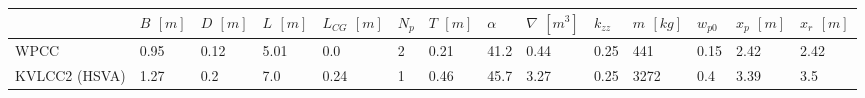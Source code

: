 \documentclass[review]{elsarticle}
\begin{document}
 \begin{savenotes}\sphinxattablestart
 \centering
 \sphinxthecaptionisattop
 \label{\detokenize{05.01_case_studies:main-dimensions-of-test-case-ship-models}}
 \sphinxaftertopcaption
 \begin{tabulary}{\linewidth}[t]{|T|T|T|T|T|T|T|T|T|T|T|T|T|T|}
 \hline
 \sphinxstyletheadfamily &\sphinxstyletheadfamily 
 
 \(B\) \([m]\)
 &\sphinxstyletheadfamily 
 
 \(D\) \([m]\)
 &\sphinxstyletheadfamily 
 
 \(L\) \([m]\)
 &\sphinxstyletheadfamily 
 
 \(L_{CG}\) \([m]\)
 &\sphinxstyletheadfamily 
 
 \(N_p\)
 &\sphinxstyletheadfamily 
 
 \(T\) \([m]\)
 &\sphinxstyletheadfamily 
 
 \(\alpha\)
 &\sphinxstyletheadfamily 
 
 \(\nabla\) \([m^3]\)
 &\sphinxstyletheadfamily 
 
 \(k_{zz}\)
 &\sphinxstyletheadfamily 
 
 \(m\) \([kg]\)
 &\sphinxstyletheadfamily 
 
 \(w_{p0}\)
 &\sphinxstyletheadfamily 
 
 \(x_{p}\) \([m]\)
 &\sphinxstyletheadfamily 
 
 \(x_{r}\) \([m]\)
 \\
 \hline
 
 WPCC
 &
 
 0.95
 &
 
 0.12
 &
 
 5.01
 &
 
 0.0
 &
 
 2
 &
 
 0.21
 &
 
 41.2
 &
 
 0.44
 &
 
 0.25
 &
 
 441
 &
 
 0.15
 &
 
 \sphinxhyphen{}2.42
 &
 
 \sphinxhyphen{}2.42
 \\
 \hline
 
 KVLCC2 (HSVA)
 &
 
 1.27
 &
 
 0.2
 &
 
 7.0
 &
 
 0.24
 &
 
 1
 &
 
 0.46
 &
 
 45.7
 &
 
 3.27
 &
 
 0.25
 &
 
 3272
 &
 
 0.4
 &
 
 \sphinxhyphen{}3.39
 &
 
 \sphinxhyphen{}3.5
 \\
 \hline
 \end{tabulary}
 \par
 \sphinxattableend\end{savenotes}
\end{document}
